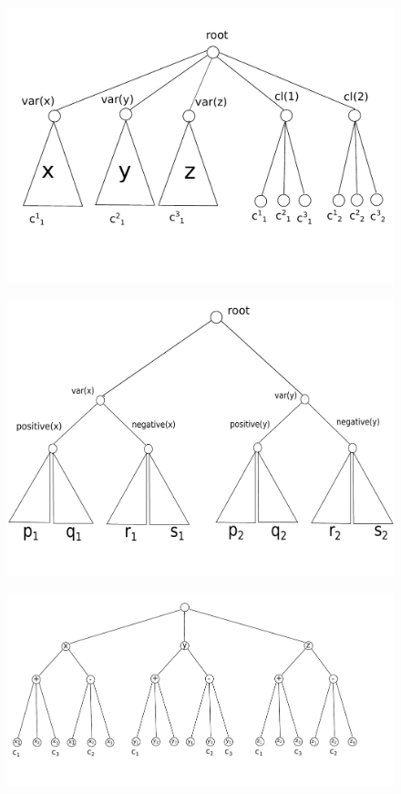 \begin{figure}[htbp]
\includegraphics[width = \columnwidth]{figs/vc-instance-r2.pdf}
\end{figure}


\begin{figure}[htbp]
\includegraphics[width = \columnwidth]{figs/lemma-two-gadgets.pdf}
\end{figure}


\begin{figure}[htbp]
\includegraphics[width = \columnwidth]{figs/formula-example.pdf}
\end{figure}

